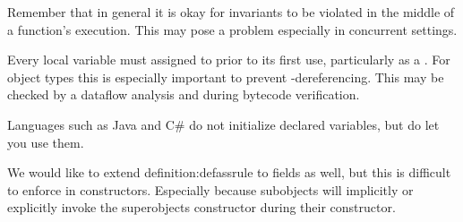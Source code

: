 \documentclass{article}
\begin{document}
Remember that in general it is okay for invariants to be violated in the middle of a function's execution.
This may pose a problem especially in concurrent settings.

\begin{definition}
  \label{definition:defassrule}
  Every local variable must assigned to prior to its first use, particularly as a \receiver{}.
  For object types this is especially important to prevent \cringe{}-dereferencing.
  This may be checked by a dataflow analysis and during bytecode verification.
\end{definition}

\begin{remark}
  Languages such as Java and C\# do not initialize declared variables, but do let you use them.
\end{remark}

We would like to extend {definition:defassrule} to fields as well, but this is difficult to enforce in constructors.
Especially because subobjects will implicitly or explicitly invoke the superobjects constructor during their constructor.
\end{document}
